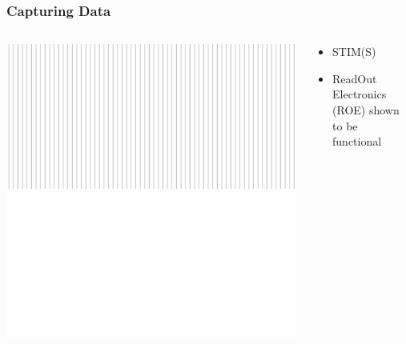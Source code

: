 \documentclass[landscape,xcolor={table}]{beamer}
\begin{document}
	\begin{frame}
		
		\frametitle{Capturing Data}
		
		\begin{columns}[T] %
		\begin{column}{.49\textwidth}

			\includegraphics[width=\textwidth]{images/selftest_plus} \\
			\includegraphics[width=\textwidth]{images/stims_zero}
			
		\end{column}%
		\hfill%
		\begin{column}{.49\textwidth}
		
			\begin{itemize}
		  		\item STIM(S)
		  		\item ReadOut Electronics (ROE) shown to be functional
		  	\end{itemize}
		
		\end{column}%
		\end{columns}
		

	\end{frame}
	
\end{document}
